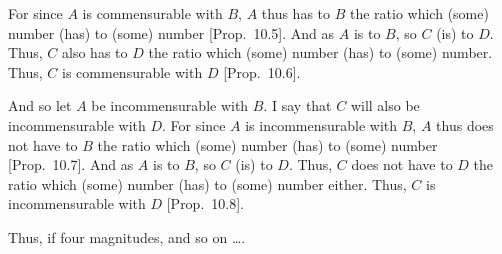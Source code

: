 \begin{Parallel}{}{}
{For since $A$ is commensurable with $B$, $A$ thus has to $B$ the ratio
which (some) number (has) to (some) number [Prop.~10.5]. And as $A$ is to $B$, so $C$ (is) to $D$. Thus, $C$ also has to $D$ the ratio which (some) number (has) to
(some) number. Thus, $C$ is commensurable with $D$ [Prop.~10.6].

And so let $A$ be incommensurable with $B$. I say that $C$ will also
be incommensurable with $D$. For since $A$ is incommensurable with
$B$, $A$ thus does not have to $B$ the ratio which  (some) number (has) to
(some) number [Prop.~10.7]. And as $A$ is to $B$, so $C$ (is) to $D$. Thus, $C$ does not have to $D$ the ratio which (some) number (has) to
(some) number either. Thus, $C$ is incommensurable with $D$ [Prop.~10.8].

Thus, if four magnitudes, and so on \ldots.}
\end{Parallel}

